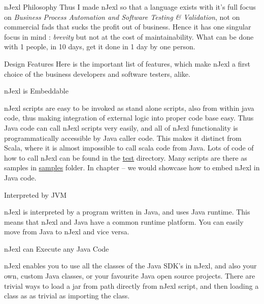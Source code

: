 \begin{section}{nJexl Philosophy}
Thus I made nJexl so that a language exists with it's full focus on \emph{Business Process Automation and Software Testing \& Validation},
not on commercial fads that sucks the profit out of business. Hence it has one singular focus in mind : \emph{brevity} but not at the cost of maintainability. What can be done with 1 people, in 10 days, get it done in 1 day by one person.

\end{section}

\begin{section}{Design Features}
Here is the important list of features, which make nJexl a first choice of the business developers and software testers, alike.

\begin{subsection}{nJexl is Embeddable}

nJexl scripts are easy to be invoked as stand alone scripts, also from within java code, 
thus making integration of external logic into proper code base easy. Thus Java code
can call nJexl scripts very easily, and all of nJexl functionality is programmatically 
accessible by Java caller code. This makes it distinct from Scala, where it is almost impossible
to call scala code from Java. Lots of code of how to call nJexl can be found 
in the \href{https://github.com/nmondal/njexl/tree/master/lang/src/test/java/com/noga/njexl/lang}{test} directory. 
Many scripts are there as samples in \href{https://github.com/nmondal/njexl/tree/master/lang/samples}{samples} folder.
In chapter -- we would showcase how to embed nJexl in Java code.
\end{subsection}

\begin{subsection}{Interpreted by JVM}

nJexl is interpreted by a program written in Java, and uses Java runtime. 
This means that nJexl and Java have a common runtime platform. 
You can easily move from Java to nJexl and vice versa.

\end{subsection}

\begin{subsection}{nJexl can Execute any Java Code}

nJexl enables you to use all the classes of the Java SDK's in nJexl, and also your own, custom Java classes, or your favourite Java open source projects. There are trivial ways to load a jar from path directly from nJexl script, and then loading a class as as trivial 
as importing the class.


\end{subsection}
\end{section}
